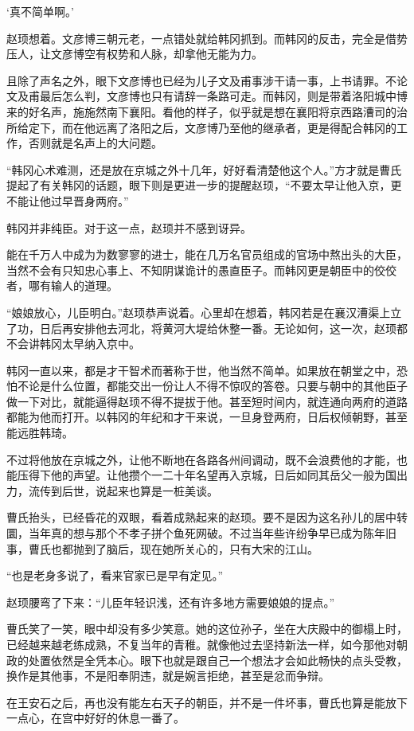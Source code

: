‘真不简单啊。’

赵顼想着。文彦博三朝元老，一点错处就给韩冈抓到。而韩冈的反击，完全是借势压人，让文彦博空有权势和人脉，却拿他无能为力。

且除了声名之外，眼下文彦博也已经为儿子文及甫事涉干请一事，上书请罪。不论文及甫最后怎么判，文彦博也只有请辞一条路可走。而韩冈，则是带着洛阳城中博来的好名声，施施然南下襄阳。看他的样子，似乎就是想在襄阳将京西路漕司的治所给定下，而在他远离了洛阳之后，文彦博乃至他的继承者，更是得配合韩冈的工作，否则就是名声上的大问题。

“韩冈心术难测，还是放在京城之外十几年，好好看清楚他这个人。”方才就是曹氏提起了有关韩冈的话题，眼下则是更进一步的提醒赵顼，“不要太早让他入京，更不能让他过早晋身两府。”

韩冈并非纯臣。对于这一点，赵顼并不感到讶异。

能在千万人中成为为数寥寥的进士，能在几万名官员组成的官场中熬出头的大臣，当然不会有只知忠心事上、不知阴谋诡计的愚直臣子。而韩冈更是朝臣中的佼佼者，哪有输人的道理。

“娘娘放心，儿臣明白。”赵顼恭声说着。心里却在想着，韩冈若是在襄汉漕渠上立了功，日后再安排他去河北，将黄河大堤给休整一番。无论如何，这一次，赵顼都不会讲韩冈太早纳入京中。

韩冈一直以来，都是才干智术而著称于世，他当然不简单。如果放在朝堂之中，恐怕不论是什么位置，都能交出一份让人不得不惊叹的答卷。只要与朝中的其他臣子做一下对比，就能逼得赵顼不得不提拔于他。甚至短时间内，就连通向两府的道路都能为他而打开。以韩冈的年纪和才干来说，一旦身登两府，日后权倾朝野，甚至能远胜韩琦。

不过将他放在京城之外，让他不断地在各路各州间调动，既不会浪费他的才能，也能压得下他的声望。让他攒个一二十年名望再入京城，日后如同其岳父一般为国出力，流传到后世，说起来也算是一桩美谈。

曹氏抬头，已经昏花的双眼，看着成熟起来的赵顼。要不是因为这名孙儿的居中转圜，当年真的想与那个不孝子拼个鱼死网破。不过当年些许纷争早已成为陈年旧事，曹氏也都抛到了脑后，现在她所关心的，只有大宋的江山。

“也是老身多说了，看来官家已是早有定见。”

赵顼腰弯了下来：“儿臣年轻识浅，还有许多地方需要娘娘的提点。”

曹氏笑了一笑，眼中却没有多少笑意。她的这位孙子，坐在大庆殿中的御榻上时，已经越来越老练成熟，不复当年的青稚。就像他过去坚持新法一样，如今那他对朝政的处置依然是全凭本心。眼下也就是跟自己一个想法才会如此畅快的点头受教，换作是其他事，不是阳奉阴违，就是婉言拒绝，甚至是忿而争辩。

在王安石之后，再也没有能左右天子的朝臣，并不是一件坏事，曹氏也算是能放下一点心，在宫中好好的休息一番了。

